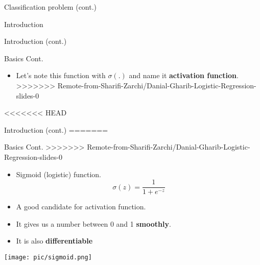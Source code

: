 \documentclass[serif, aspectratio=169]{beamer}
\begin{document}
\begin{frame}{Classification problem (cont.)}
\begin{itemize}
\begin{frame}{Introduction}
\begin{itemize}
\begin{frame}{Introduction (cont.)}
\begin{frame}{Basics Cont.}
\begin{itemize}
        \item Let's note this function with $\sigma (.)$ and name it \textbf{activation function}.
>>>>>>> Remote-from-Sharifi-Zarchi/Danial-Gharib-Logistic-Regression-slides-0
        
    \end{itemize}
\end{frame}

<<<<<<< HEAD
\begin{frame}{Introduction (cont.)}
=======
\begin{frame}{Basics Cont.}
>>>>>>> Remote-from-Sharifi-Zarchi/Danial-Gharib-Logistic-Regression-slides-0
    \begin{minipage}{0.55\textwidth}
    \begin{itemize}
        \item Sigmoid (logistic) function.
        \[
            \sigma (z) = \frac{1}{1 + e^{-z}}
        \]
        \item A good candidate for activation function.
        
        \item It gives us a number between 0 and 1 \textbf{smoothly}.
        \item It is also \textbf{differentiable}

    \end{itemize}
    \end{minipage}%
    \begin{minipage}{0.4\textwidth}
        \centering
        \texttt{[image: pic/sigmoid.png]}
    \end{minipage}
\end{frame}
    

\end{frame}
\end{frame}
\end{itemize}
\end{frame}
\end{itemize}
\end{frame}
\end{document}
